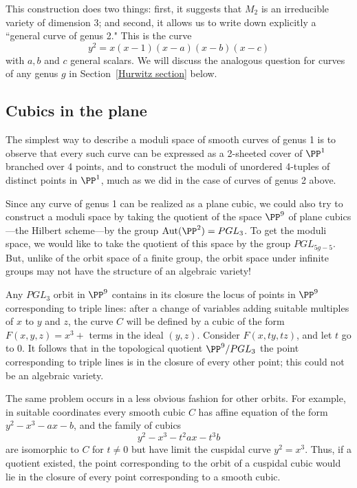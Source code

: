This construction does two things: first, it suggests that $M_2$ is an irreducible variety of dimension 3; and
second, it allows us to write down explicitly a ``general curve of genus 2." This is the curve
$$
y^2 = x(x-1)(x-a)(x-b)(x-c)
$$
with $a, b$ and $c$ general scalars. We will discuss the analogous question for curves of any genus $g$ in Section~\ref{Hurwitz section} below.

\subsection{Cubics in the plane}

The simplest way to describe a moduli space of smooth curves of genus 1 is to observe that every such curve can be expressed as a 2-sheeted cover of $\PP^1$ branched over 4 points, and to construct the moduli of unordered 4-tuples of distinct points in $\PP^1$, much as we did in the case of curves of genus 2 above.


Since any curve of genus 1 can be realized as a plane cubic, we could also try to construct a moduli space by taking the quotient of the space $\PP^9$ of plane cubics---the Hilbert scheme---by the group ${\rm Aut}(\PP^2) = PGL_3$. To get the moduli space, we would like to take the quotient of this space by the group $PGL_{5g-5}$. But, unlike of the orbit space of a finite group, the orbit space under infinite groups may not have the structure of an algebraic variety! 


Any $PGL_3$ orbit in $\PP^9$ contains in its closure the locus of points in $\PP^9$ corresponding to triple lines: after a change of variables adding suitable multiples of $x$ to $y$ and $z$, the curve $C$ will be defined by a cubic of the form $F(x,y,z) = x^3+$ terms in the ideal $(y,z)$.
Consider $F(x,ty, tz)$, and let $t$ go to 0. It follows that in the topological quotient $\PP^9/PGL_3$ the point corresponding to triple lines is in the closure of every other point; this could not be an algebraic variety.

The same problem occurs in a less obvious fashion for other orbits. For example, in suitable coordinates every smooth cubic $C$ has affine equation of the form $y^2-x^3 - ax - b$, and the family of cubics
$$
y^2 - x^3 - t^2ax - t^3b 
$$
are isomorphic to $C$ for $t \neq 0$ but have limit the cuspidal curve $y^2 = x^3$.
Thus, if a quotient existed, the point corresponding to the orbit of a cuspidal cubic would lie in the closure of every point corresponding to a smooth cubic. 

